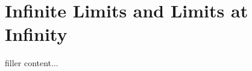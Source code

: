 \documentclass[../../templates/section]{subfiles}
\begin{document}
\section{Infinite Limits and Limits at Infinity}\label{sec:infinite-limits-and-limits-at-infinity}

filler content...
\end{document}
